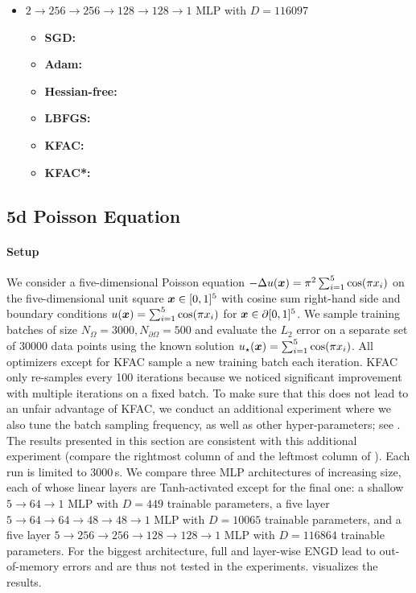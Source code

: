 \begin{itemize}
\item $2 \to 256 \to 256\to 128 \to 128 \to 1$ MLP with $D=\num{116097}$
  \begin{itemize}
    \def\pathToRuns{kfac_pinns_exp/exp20_poisson2d_mlp_tanh_256/tex}
  \item \textbf{SGD:} 
  \item \textbf{Adam:} 
  \item \textbf{Hessian-free:} 
  \item \textbf{LBFGS:} 
  \item \textbf{KFAC:} 
  \item \textbf{KFAC*:} 
  \end{itemize}
\end{itemize}

\subsection{5d Poisson Equation}\label{sec:poisson5d-appendix}

\paragraph{Setup} We consider a five-dimensional Poisson equation $-\Delta u({\bm{x}}) = \pi^2 \sum_{i=1}^5 \cos(\pi {x}_i)$ on the five-dimensional unit square ${\bm{x}} \in [0, 1]^5$ with cosine sum right-hand side and boundary conditions $u({\bm{x}}) = \sum_{i=1}^5 \cos(\pi {x}_i)$ for ${\bm{x}} \in \partial [0,1]^5$.
We sample training batches of size $N_{\Omega} = \num{3000}, N_{\partial\Omega} = 500$ and evaluate the $L_2$ error on a separate set of $\num{30000}$ data points using the known solution $u_{\star}({\bm{x}}) = \sum_{i=1}^5 \cos(\pi {x}_i)$.
All optimizers except for KFAC sample a new training batch each iteration.
KFAC only re-samples every 100 iterations because we noticed  significant improvement with multiple iterations on a fixed batch.
To make sure that this does not lead to an unfair advantage of KFAC, we conduct an additional experiment where we also tune the batch sampling frequency, as well as other hyper-parameters; see .
The results presented in this section are consistent with this additional experiment (compare the rightmost column of  and the leftmost column of ).
Each run is limited to 3000\,s.
We compare three MLP architectures of increasing size, each of whose linear layers are Tanh-activated except for the final one: a shallow $5\to 64\to 1$ MLP with $D=449$ trainable parameters, a five layer $5 \to 64 \to 64 \to 48 \to 48 \to 1$ MLP with $D=\num{10065}$ trainable parameters, and a five layer $5 \to 256 \to 256\to 128 \to 128 \to 1$ MLP with $D=\num{116864}$ trainable parameters.
For the biggest architecture, full and layer-wise ENGD lead to out-of-memory errors and are thus not tested in the experiments.
 visualizes the results.

